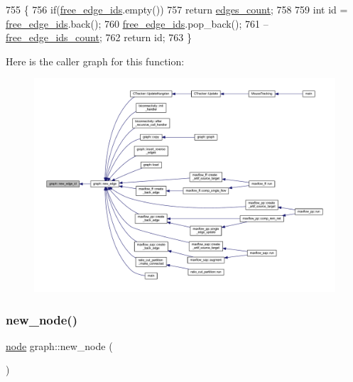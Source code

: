 \begin{DoxyCode}
755 \{
756     \textcolor{keywordflow}{if}(\mbox{\hyperlink{classgraph_a2bef57ea1db5b5541b3cce866de179f0}{free\_edge\_ids}}.empty())
757     \textcolor{keywordflow}{return} \mbox{\hyperlink{classgraph_af560ff4263ad165c166a46084e781b4a}{edges\_count}};
758    
759     \textcolor{keywordtype}{int} \textcolor{keywordtype}{id} = \mbox{\hyperlink{classgraph_a2bef57ea1db5b5541b3cce866de179f0}{free\_edge\_ids}}.back();
760     \mbox{\hyperlink{classgraph_a2bef57ea1db5b5541b3cce866de179f0}{free\_edge\_ids}}.pop\_back();
761     --\mbox{\hyperlink{classgraph_a336be547b5e0ca43b96cf00131e0e1da}{free\_edge\_ids\_count}};
762     \textcolor{keywordflow}{return} id;
763 \}
\end{DoxyCode}
Here is the caller graph for this function\+:\nopagebreak
\begin{figure}[H]
\begin{center}
\leavevmode
\includegraphics[width=350pt]{classgraph_a3f3121c481746ab0a19eb187da5c0246_icgraph}
\end{center}
\end{figure}
\mbox{\label{classgraph_ab9505335c20558319b6cce25aed23524}} 
\subsubsection{\texorpdfstring{new\+\_\+node()}{new\_node()}}
{\footnotesize\ttfamily \mbox{\hyperlink{classnode}{node}} graph\+::new\+\_\+node (\begin{DoxyParamCaption}{ }\end{DoxyParamCaption})\hspace{0.3cm}{\ttfamily [virtual]}}

